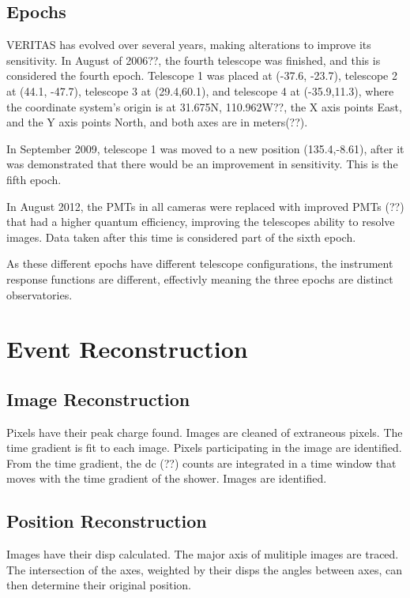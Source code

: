 \subsection{Epochs}\label{sec:epochs}
VERITAS has evolved over several years, making alterations to improve its sensitivity.
In August of 2006??, the fourth telescope was finished, and this is considered the fourth epoch.
Telescope 1 was placed at (-37.6, -23.7), telescope 2 at (44.1, -47.7), telescope 3 at (29.4,60.1), and telescope 4 at (-35.9,11.3), where the coordinate system's origin is at 31.675N, 110.962W??, the X axis points East, and the Y axis points North, and both axes are in meters(??).

In September 2009, telescope 1 was moved to a new position (135.4,-8.61), after it was demonstrated that there would be an improvement in sensitivity.
This is the fifth epoch.

In August 2012, the PMTs in all cameras were replaced with improved PMTs (??) that had a higher quantum efficiency, improving the telescopes ability to resolve images.
Data taken after this time is considered part of the sixth epoch.

As these different epochs have different telescope configurations, the instrument response functions are different, effectivly meaning the three epochs are distinct observatories.


\section{Event Reconstruction}\label{sec:recon}

\subsection{Image Reconstruction}\label{subsec:imgrecon}

Pixels have their peak charge found.
Images are cleaned of extraneous pixels.
The time gradient is fit to each image.
Pixels participating in the image are identified.
From the time gradient, the dc (??) counts are integrated in a time window that moves with the time gradient of the shower.
Images are identified.

\subsection{Position Reconstruction}\label{subsec:posrecon}
Images have their disp calculated.
The major axis of mulitiple images are traced.
The intersection of the axes, weighted by their disps the angles between axes, can then determine their original position.

